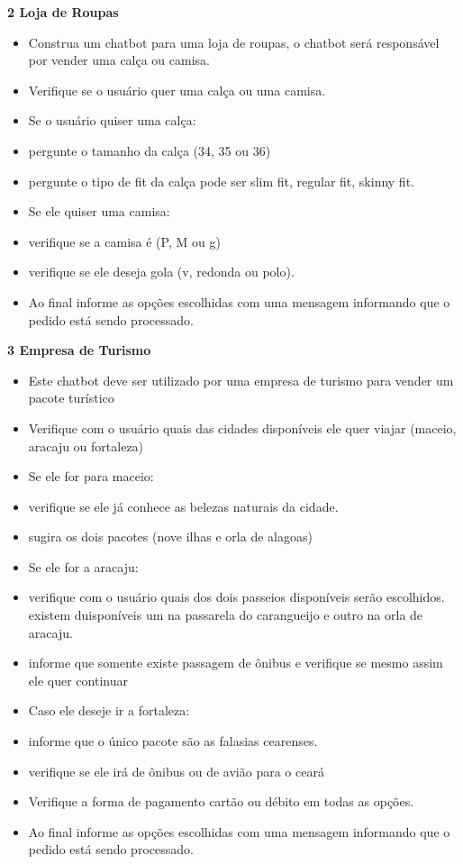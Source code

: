 \documentclass[14pt,a4paper,oneside]{book}
\begin{document}
\vspace{\baselineskip}

\textbf{2 Loja de Roupas} \\

\begin{itemize}[nosep]
	\item Construa um chatbot para uma loja de roupas, o chatbot será responsável por vender uma calça ou camisa.
	\item Verifique se o usuário quer uma calça ou uma camisa.
	\item Se o usuário quiser uma calça:
	\item pergunte o tamanho da calça (34, 35 ou 36)
	\item pergunte o tipo de fit da calça pode ser slim fit, regular fit, skinny fit.
	\item Se ele quiser uma camisa:
	\item verifique se a camisa é (P, M ou g)
	\item verifique se ele deseja gola (v, redonda ou polo).
	\item Ao final informe as opções escolhidas com uma mensagem informando que o pedido está sendo processado.
\end{itemize} 

\vspace{\baselineskip}

\textbf{3 Empresa de Turismo} \\

\begin{itemize}[nosep]
	\item Este chatbot deve ser utilizado por uma empresa de turismo para vender um pacote turístico
	\item Verifique com o usuário quais das cidades disponíveis ele quer viajar (maceio, aracaju ou fortaleza)
	\item Se ele for para maceio:
	\item verifique se ele já conhece as belezas naturais da cidade.
	\item sugira os dois pacotes (nove ilhas e orla de alagoas)
	\item Se ele for a aracaju:
	\item verifique com o usuário quais dos dois passeios disponíveis serão escolhidos. existem duisponíveis um na passarela do carangueijo e outro na orla de aracaju.
	\item informe que somente existe passagem de ônibus e verifique se mesmo assim ele quer continuar
	\item Caso ele deseje ir a fortaleza:
	\item informe que o único pacote são as falasias cearenses.
	\item verifique se ele irá de ônibus ou de avião para o ceará
	\item Verifique a forma de pagamento cartão ou débito em todas as opções.
	\item Ao final informe as opções escolhidas com uma mensagem informando que o pedido está sendo processado.
\end{itemize} 
\end{document}
